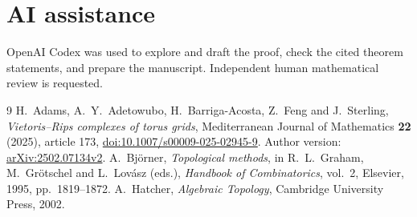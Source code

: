 \documentclass[11pt]{amsart}
\begin{document}
\section*{AI assistance}
OpenAI Codex was used to explore and draft the proof, check the cited
theorem statements, and prepare the manuscript. Independent human
mathematical review is requested.

\begin{thebibliography}{9}
H.~Adams, A.~Y.~Adetowubo, H.~Barriga-Acosta, Z.~Feng and J.~Sterling,
\emph{Vietoris--Rips complexes of torus grids},
Mediterranean Journal of Mathematics \textbf{22} (2025), article 173,
\href{https://doi.org/10.1007/s00009-025-02945-9}{doi:10.1007/s00009-025-02945-9}.
Author version: \href{https://arxiv.org/abs/2502.07134v2}{arXiv:2502.07134v2}.
A.~Bj\"orner, \emph{Topological methods},
in R.~L.~Graham, M.~Gr\"otschel and L.~Lov\'asz (eds.),
\emph{Handbook of Combinatorics}, vol.~2, Elsevier, 1995, pp.~1819--1872.
A.~Hatcher, \emph{Algebraic Topology}, Cambridge University Press, 2002.
\end{thebibliography}
\end{document}
